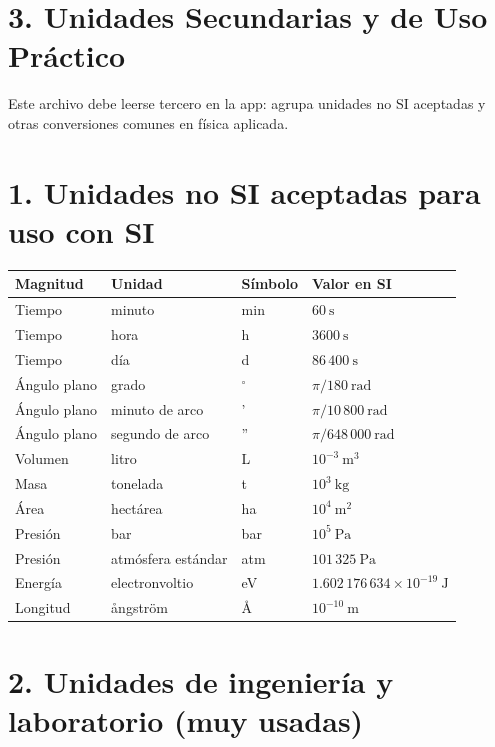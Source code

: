 \documentclass[11pt,a4paper]{article}
\begin{document}
\section*{3. Unidades Secundarias y de Uso Práctico}

Este archivo debe leerse tercero en la app: agrupa unidades no SI aceptadas y otras conversiones comunes en física aplicada.

\section*{1. Unidades no SI aceptadas para uso con SI}

\scriptsize
\begin{tabularx}{\linewidth}{>{\raggedright\arraybackslash}X>{\raggedright\arraybackslash}X>{\raggedright\arraybackslash}X>{\raggedright\arraybackslash}X}
\hline
Magnitud & Unidad & Símbolo & Valor en SI \\
\hline
Tiempo & minuto & min & $60\ \mathrm{s}$ \\
\hline
Tiempo & hora & h & $3600\ \mathrm{s}$ \\
\hline
Tiempo & día & d & $86\,400\ \mathrm{s}$ \\
\hline
Ángulo plano & grado & $^\circ$ & $\pi/180\ \mathrm{rad}$ \\
\hline
Ángulo plano & minuto de arco & ' & $\pi/10\,800\ \mathrm{rad}$ \\
\hline
Ángulo plano & segundo de arco & '' & $\pi/648\,000\ \mathrm{rad}$ \\
\hline
Volumen & litro & L & $10^{-3}\ \mathrm{m}^3$ \\
\hline
Masa & tonelada & t & $10^3\ \mathrm{kg}$ \\
\hline
Área & hectárea & ha & $10^4\ \mathrm{m}^2$ \\
\hline
Presión & bar & bar & $10^5\ \mathrm{Pa}$ \\
\hline
Presión & atmósfera estándar & atm & $101\,325\ \mathrm{Pa}$ \\
\hline
Energía & electronvoltio & eV & $1.602\,176\,634\times10^{-19}\ \mathrm{J}$ \\
\hline
Longitud & ångström & Å & $10^{-10}\ \mathrm{m}$ \\
\hline
\end{tabularx}
\normalsize

\section*{2. Unidades de ingeniería y laboratorio (muy usadas)}
\end{document}
